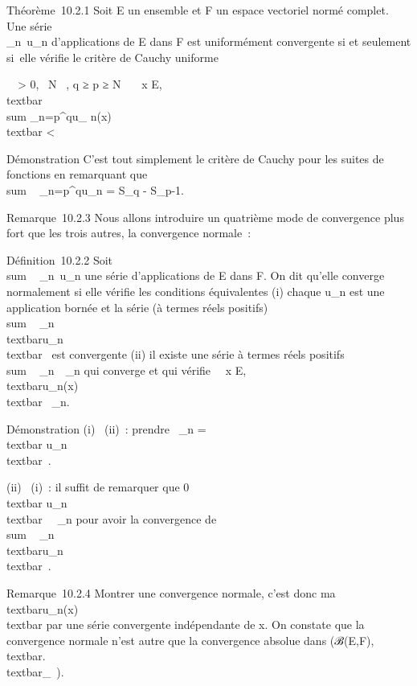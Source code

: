 \documentclass[]{article}
\begin{document}
Théorème~10.2.1 Soit E un ensemble et F un espace vectoriel normé
complet. Une série \\\sum
 \_n\in{}~u\_n d'applications de E dans F est uniformément
convergente si et seulement si~elle vérifie le critère de Cauchy
uniforme

\forall~~\epsilon \textgreater{} 0,
\exists~N \in {}~, q ≥ p ≥ N
\rigtharrow~\forall~~x \in E,
\\textbar{}\\sum
\_n=p^qu\_ n(x)\\textbar{}
\textless{} \epsilon

Démonstration C'est tout simplement le critère de Cauchy pour les suites
de fonctions en remarquant que
\\sum ~
\_n=p^qu\_n = S\_q - S\_p-1.

Remarque~10.2.3 Nous allons introduire un quatrième mode de convergence
plus fort que les trois autres, la convergence normale~:

Définition~10.2.2 Soit
\\sum ~
\_n\in{}~u\_n une série d'applications de E dans F. On dit
qu'elle converge normalement si elle vérifie les conditions équivalentes
(i) chaque u\_n est une application bornée et la série (à termes
réels positifs) \\sum ~
\_n\in{}~\\textbar{}u\_n\\textbar{}\infty~
est convergente (ii) il existe une série à termes réels positifs
\\sum ~
\_n\in{}~\alpha~\_n qui converge et qui vérifie
\forall~~x \in E,
\\textbar{}u\_n(x)\\textbar{} \leq
\alpha~\_n.

Démonstration (i) \rigtharrow~(ii)~: prendre \alpha~\_n
=\\textbar{} u\_n\\textbar{}\infty~.

(ii) \rigtharrow~(i)~: il suffit de remarquer que 0 \leq\\textbar{}
u\_n\\textbar{}\infty~ \leq \alpha~\_n pour avoir la
convergence de \\sum ~
\_n\in{}~\\textbar{}u\_n\\textbar{}\infty~.

Remarque~10.2.4 Montrer une convergence normale, c'est donc ma\jmathorer
\\textbar{}u\_n(x)\\textbar{} par
une série convergente indépendante de x. On constate que la convergence
normale n'est autre que la convergence absolue dans
(ℬ(E,F),\\textbar{}.\\textbar{}\_\infty~).
\end{document}
